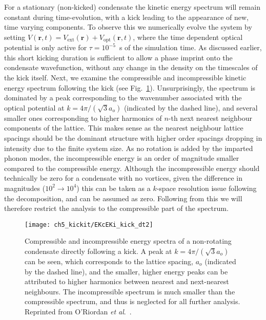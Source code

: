 For a stationary (non-kicked) condensate the kinetic energy spectrum will remain constant during time-evolution, with a kick leading to the appearance of new, time varying components. To observe this we numerically evolve the system by setting $V(\mathbf{r},t) = V_{\text{ext}}(\mathbf{r}) + V_{\text{opt}}(\mathbf{r},t)$, where the time dependent optical potential is only active for $\tau=10^{-5}$~s of the simulation time. As discussed earlier, this short kicking duration is sufficient to allow a phase imprint onto the condensate wavefunction, without any change in the density on the timescales of the kick itself. Next, we examine the compressible and incompressible kinetic energy spectrum following the kick (see Fig.~\ref{fig:ekc_eki_novtx}). Unsurprisingly, the spectrum is dominated by a peak corresponding to the wavenumber associated with the optical potential at $k=4\pi/(\sqrt{3}a_o)$ (indicated by the dashed line), and several smaller ones corresponding to higher harmonics of $n$-th next nearest neighbour components of the lattice. This makes sense as the nearest neighbour lattice spacings should be the dominant structure with higher order spacings dropping in intensity due to the finite system size. As no rotation is added by the imparted phonon modes, the incompressible energy is an order of magnitude smaller compared to the compressible energy. Although the incompressible energy should technically be zero for a condensate with no vortices, given the difference in magnitudes ($10^2 \to 10^4$) this can be taken as a $k$-space resolution issue following the decomposition, and can be assumed as zero. Following from this we will therefore restrict the analysis to the compressible part of the spectrum.

\begin{figure}
    \centering
    \texttt{[image: ch5\_kickit/EKcEKi\_kick\_dt2]}
    \caption[Compressible and incompressible energy spectra of a non-rotating condensate directly following a kick.]{Compressible and incompressible energy spectra of a non-rotating condensate directly following a kick. A peak at $k=4\pi/(\sqrt{3}a_o)$ can be seen, which corresponds to the lattice spacing, $a_o$ (indicated by the dashed line), and the smaller, higher energy peaks can be attributed to higher harmonics between nearest and next-nearest neighbours. The incompressible spectrum is much smaller than the compressible spectrum, and thus is neglected for all further analysis. Reprinted from O'Riordan {\textit{et al}.}~\cite{VTX:oriordan_pra_2016}.}
    \label{fig:ekc_eki_novtx}
\end{figure}

